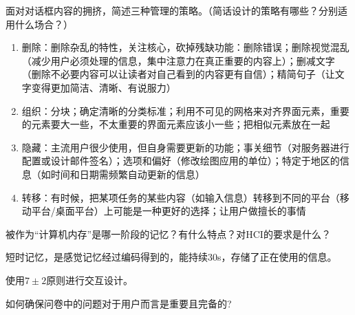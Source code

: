 \begin{problem}[2014、2016]
面对对话框内容的拥挤，简述三种管理的策略。（简话设计的策略有哪些？分别适用什么场合？）
\end{problem}

\begin{solution}
\begin{enumerate}[label=\arabic*.]
    \item 删除：删除杂乱的特性，关注核心，砍掉残缺功能：删除错误；删除视觉混乱（减少用户必须处理的信息，集中注意力在真正重要的内容上）；删减文字（删除不必要内容可以让读者对自己看到的内容更有自信）；精简句子（让文字变得更加简洁、清晰、有说服力）
    \item 组织：分块；确定清晰的分类标准；利用不可见的网格来对齐界面元素，重要的元素要大一些，不太重要的界面元素应该小一些；把相似元素放在一起
    \item 隐藏：主流用户很少使用，但自身需要更新的功能；事关细节（对服务器进行配置或设计邮件签名）；选项和偏好（修改绘图应用的单位）；特定于地区的信息（如时间和日期需频繁自动更新的信息）
    \item 转移：有时候，把某项任务的某些内容（如输入信息）转移到不同的平台（移动平台/桌面平台）上可能是一种更好的选择；让用户做擅长的事情
\end{enumerate}
\end{solution}



\begin{problem}[2016]
被作为“计算机内存”是哪一阶段的记忆？有什么特点？对HCI的要求是什么？
\end{problem}

\begin{solution}
短时记忆，是感觉记忆经过编码得到的，能持续30s，存储了正在使用的信息。

使用$7 \pm 2$原则进行交互设计。
\end{solution}



\begin{problem}[2012、2014]
如何确保问卷中的问题对于用户而言是重要且完备的?
\end{problem}

